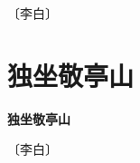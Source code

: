 \documentclass[12pt,UTF-8,openany,fontset=none]{ctexbook}
\begin{document}
\begin{center}
    \vspace{10pt}
    
    \begin{large}
        
        〔李白〕
        
    \end{large}
    
    \vspace{8pt}
    
    \begin{huge}
        
        \phantom{。}

        \phantom{。}
        
        \phantom{。}

        \phantom{。}
        
    \end{huge}
    
\end{center}

\vspace{8pt}
\clearpage


\section{独坐敬亭山}



\begin{center}
    {\bfseries 独坐敬亭山}
\end{center}

\begin{center}
    \vspace{10pt}
    
    \begin{large}
        
        〔李白〕
        
    \end{large}
    
    \vspace{8pt}
    
    \begin{huge}
        
        \phantom{。}

        \phantom{。}
        
        \phantom{。}~~

        \phantom{。}
        
    \end{huge}
    
\end{center}
\end{document}

